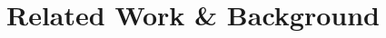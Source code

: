 \documentclass{sig-alternate-05-2015}
\begin{document}
%	
%	
%	

	\section{Related Work \& Background}	
\end{document}
